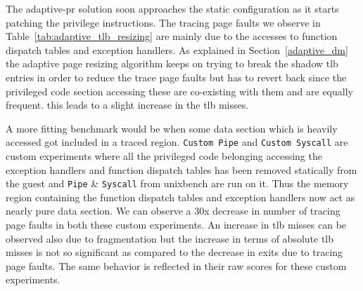 The adaptive-pr solution soon approaches the static configuration as it starts patching the privilege instructions. The tracing page faults we observe in Table~\ref{tab:adaptive_tlb_resizing} are mainly due to the accesses to function dispatch tables and exception handlers. As explained in Section~\ref{adaptive_dm} the adaptive page resizing algorithm keeps on trying to break the shadow tlb entries in order to reduce the trace page faults but has to revert back since the privileged code section accessing these are co-existing with them and are equally frequent. this leads to a slight increase in the tlb misses. 

A more fitting benchmark would be when some data section which is heavily accessed got included in a traced region. {\tt Custom Pipe} and {\tt Custom Syscall} are custom experiments where all the privileged code belonging accessing the exception handlers and function dispatch tables has been removed statically from the guest and {\tt Pipe} \& {\tt Syscall} from unixbench are run on it. Thus the memory region containing the function dispatch tables and exception handlers now act as nearly pure data section. We can observe a 30x decrease in number of tracing page faults in both these custom experiments. An increase in tlb misses can be observed also due to fragmentation but the increase in terms of absolute tlb misses is not so significant as compared to the decrease in exits due to tracing page faults. The same behavior is reflected in their raw scores for these custom experiments.

